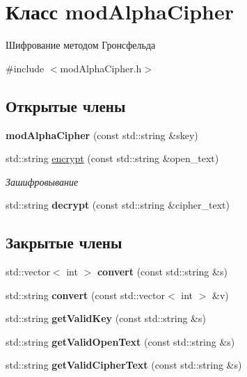 \hypertarget{classmodAlphaCipher}{}\section{Класс mod\+Alpha\+Cipher}
\label{classmodAlphaCipher}


Шифрование методом Гронсфельда  




{\ttfamily \#include $<$mod\+Alpha\+Cipher.\+h$>$}

\subsection*{Открытые члены}
\begin{DoxyCompactItemize}
\item 
\mbox{\label{classmodAlphaCipher_a76a420025b3c08f72c9b996d83c6ff09}} 
{\bfseries mod\+Alpha\+Cipher} (const std\+::string \&skey)
\item 
std\+::string \hyperlink{classmodAlphaCipher_ab855d6b2ba63a70d84abc8b15700da63}{encrypt} (const std\+::string \&open\+\_\+text)
\begin{DoxyCompactList}\small\item\em Зашифровывание \end{DoxyCompactList}\item 
\mbox{\label{classmodAlphaCipher_af1f0fa8ec93df56aa7657494de2a3f00}} 
std\+::string {\bfseries decrypt} (const std\+::string \&cipher\+\_\+text)
\end{DoxyCompactItemize}
\subsection*{Закрытые члены}
\begin{DoxyCompactItemize}
\item 
\mbox{\label{classmodAlphaCipher_ab8f9e5e8ee499c8df2d1e45822f5ac7f}} 
std\+::vector$<$ int $>$ {\bfseries convert} (const std\+::string \&s)
\item 
\mbox{\label{classmodAlphaCipher_afa3ddac1b01e7847238478963d667d4a}} 
std\+::string {\bfseries convert} (const std\+::vector$<$ int $>$ \&v)
\item 
\mbox{\label{classmodAlphaCipher_a6e22f85d0847650a18be5838ca9175c5}} 
std\+::string {\bfseries get\+Valid\+Key} (const std\+::string \&s)
\item 
\mbox{\label{classmodAlphaCipher_ace571c0bf1e21e6cb31f3df78a1812bd}} 
std\+::string {\bfseries get\+Valid\+Open\+Text} (const std\+::string \&s)
\item 
\mbox{\label{classmodAlphaCipher_a29591c14f56205ecad3d99689bf72193}} 
std\+::string {\bfseries get\+Valid\+Cipher\+Text} (const std\+::string \&s)
\end{DoxyCompactItemize}
